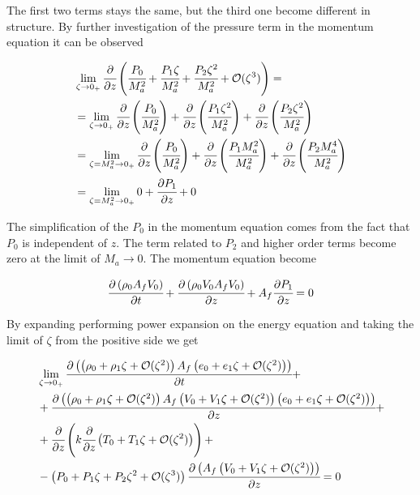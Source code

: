 \documentclass[../Parameter_fitting.tex]{subfiles}
\begin{document}
	The first two terms stays the same, but the third one become different in structure. By further investigation of the pressure term in the momentum equation it can be observed
	
	{\footnotesize
		\begin{align*}
			& \lim_{\zeta \rightarrow 0_+} \cfrac{\partial }{\partial z} \left(  \cfrac{P_0}{M_a^2}	+ \cfrac{P_1 \zeta}{M_a^2}	+ \cfrac{P_2 \zeta^2}{M_a^2} + \mathcal{O}(\zeta^3) \right) = \\
			& = \lim_{\zeta \rightarrow 0_+} \cfrac{\partial }{\partial z} \left(  \cfrac{P_0}{M_a^2} \right) + \cfrac{\partial }{\partial z} \left(  \cfrac{P_1 \zeta^2}{M_a^2} \right) + \cfrac{\partial }{\partial z} \left(  \cfrac{P_2 \zeta^2}{M_a^2} \right) \\
			& = \lim_{\zeta=M_a^2 \rightarrow 0_+} \cfrac{\partial }{\partial z} \left(  \cfrac{P_0}{M_a^2} \right) + \cfrac{\partial }{\partial z} \left(  \cfrac{P_1 M_a^2}{M_a^2} \right) + \cfrac{\partial }{\partial z} \left(  \cfrac{P_2 M_a^4}{M_a^2} \right) \\
			& = \lim_{\zeta=M_a^2 \rightarrow 0_+} 0 + \cfrac{\partial P_1}{\partial z}  + 0 \\
		\end{align*}
	}

	The simplification of the $P_0$ in the momentum equation comes from the fact that $P_0$ is independent of $z$. The term related to $P_2$ and higher order terms become zero at the limit of $M_a \rightarrow 0$. The momentum equation become
	
	{\footnotesize
		\begin{equation*}
			\cfrac{\partial \left( \rho_0 A_f V_0 \right) }{\partial t}	+ \cfrac{\partial \left( \rho_0 V_0 A_f V_0 \right)}{\partial z} + A_f \cfrac{\partial P_1}{\partial z} = 0
		\end{equation*}
	}

	By expanding performing power expansion on the energy equation and taking the limit of $\zeta$ from the positive side we get
	
	{\footnotesize
		\begin{align*}
			& \lim_{\zeta \rightarrow 0_+} \cfrac{\partial \left( \left( \rho_0	+ \rho_1 \zeta	+ \mathcal{O}(\zeta^2) \right) A_f \left( e_0	+ e_1 \zeta 	+ \mathcal{O}(\zeta^2) \right) \right)}{\partial t} + \\
			&+ \cfrac{\partial \left(  \left(  \rho_0	+ \rho_1 \zeta	+ \mathcal{O}(\zeta^2) \right) A_f \left( V_0	+ V_1 \zeta 	+ \mathcal{O}(\zeta^2) \right) \left( e_0	+ e_1 \zeta 	+ \mathcal{O}(\zeta^2) \right) \right) }{\partial z} + \\
			&+ \cfrac{\partial}{\partial z} \left( k \cfrac{\partial }{\partial z} \left( T_0 	+ T_1 \zeta 	+ \mathcal{O}(\zeta^2) \right) \right) + \\
			&- \left(  P_0 	+ P_1 \zeta		+ P_2 \zeta^2 		+ \mathcal{O}(\zeta^3)  \right) \cfrac{\partial \left( A_f \left( V_0 + V_1 \zeta + \mathcal{O}(\zeta^2) \right) \right) }{\partial z} = 0
		\end{align*}
	}
	
\end{document}
